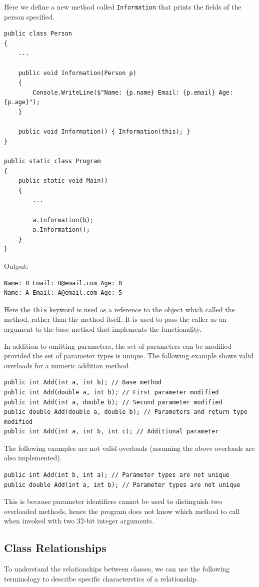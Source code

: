 \documentclass{article}
\begin{document}
Here we define a new method called
\lstinline{Information} that prints the fields of the person specified.
\begin{lstlisting}
public class Person
{
    ...

    public void Information(Person p)
    {
        Console.WriteLine($"Name: {p.name} Email: {p.email} Age: {p.age}");
    }

    public void Information() { Information(this); }
}

public static class Program
{
    public static void Main()
    {
        ...

        a.Information(b);
        a.Information();
    }
}
\end{lstlisting}
Output:
\begin{lstlisting}[numbers=none]
Name: B Email: B@email.com Age: 0
Name: A Email: A@email.com Age: 5
\end{lstlisting}
Here the \lstinline{this} keyword is used as a reference to the object which called the method, rather than the method itself.
It is used to pass the caller as an argument to the base method that implements the functionality.

In addition to omitting parameters, the set of parameters can be modified provided the set of parameter types
is unique. The following example shows valid overloads for a numeric addition method.
\begin{lstlisting}
public int Add(int a, int b); // Base method
public int Add(double a, int b); // First parameter modified
public int Add(int a, double b); // Second parameter modified
public double Add(double a, double b); // Parameters and return type modified 
public int Add(int a, int b, int c); // Additional parameter
\end{lstlisting}
The following examples are not valid overloads (assuming the above overloads are also implemented).
\begin{lstlisting}
public int Add(int b, int a); // Parameter types are not unique 
public double Add(int a, int b); // Parameter types are not unique 
\end{lstlisting}
This is because parameter identifiers cannot be used to distinguish two overloaded methods,
hence the program does not know which method to call when invoked with two 32-bit integer arguments.
\subsection{Class Relationships}
To understand the relationships between classes, we can use the following terminology to describe specific
characterstics of a relationship.
\end{document}
